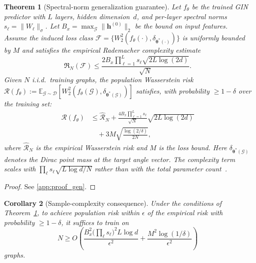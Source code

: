 \documentclass[aps,prx,reprint,superscriptaddress,longbibliography]{revtex4-2}
\newcommand{\GIN}{\textnormal{\textsc{GIN}}}
\newcommand{\calG}{\mathcal{G}}
\newcommand{\calD}{\mathcal{D}}
\newcommand{\calF}{\mathcal{F}}
\newcommand{\calR}{\mathcal{R}}
\newcommand{\bbE}{\mathbb{E}}
\newtheorem{theorem}{Theorem}
\newtheorem{corollary}[theorem]{Corollary}
\begin{document}
\begin{theorem}[Spectral-norm generalization guarantee]
\label{thm:generalization}
Let $f_\theta$ be the trained \GIN{} predictor with $L$ layers,
hidden dimension~$d$, and per-layer spectral norms
$s_\ell = \|W_\ell\|_{\sigma}$.
Let $B_x = \max_{\calG} \|\bm{h}^{(0)}\|_2$ be the bound on
input features. Assume the induced loss class
$\calF = \{W_2^2(f_\theta(\cdot),\delta_{\bm\theta^*(\cdot)})\}$ is
uniformly bounded by $M$ and satisfies the empirical Rademacher
complexity estimate
\begin{equation*}
    \mathfrak{R}_N(\calF) \le \frac{2 B_x \prod_{\ell=1}^{L} s_\ell
    \sqrt{2L\log(2d)}}{\sqrt{N}}.
\end{equation*}
Given $N$ i.i.d.\ training graphs, the
population Wasserstein risk
$\calR(f_\theta)
\!:=\!
\bbE_{\calG \sim \calD}[W_2^2(f_\theta(\calG),
\delta_{\bm\theta^*(\calG)})]$
satisfies, with probability $\ge 1 - \delta$ over the
training set:
\begin{align}
    \calR(f_\theta)
    &\le \hat{\calR}_N
    + \frac{4 B_x \prod_{\ell=1}^{L} s_\ell}{\sqrt{N}}
    \sqrt{2L\log(2d)} \nonumber \\
    &\quad + 3M\!\sqrt{\frac{\log(2/\delta)}{2N}},
    \label{eq:gen_bound}
\end{align}
where $\hat{\calR}_N$ is the empirical Wasserstein risk
and $M$ is the loss bound. Here $\delta_{\bm\theta^*(\calG)}$ denotes
the Dirac point mass at the target angle vector. The complexity term scales with
$\prod_\ell s_\ell \sqrt{L\log d / N}$ rather than with the total
parameter count~\cite{bartlett2017,neyshabur2018,golowich2018}.
\end{theorem}

\begin{proof}
See \cref{app:proof_gen}.
\end{proof}

\begin{corollary}[Sample-complexity consequence]
\label{cor:sample_complexity}
Under the conditions of Theorem~\ref{thm:generalization}, to
achieve population risk within $\epsilon$ of the empirical risk
with probability $\ge 1 - \delta$, it suffices to train on
\begin{equation}
    N \ge O\!\left(
    \frac{B_x^2 \bigl(\prod_\ell s_\ell\bigr)^2
    L \log d}{\epsilon^2}
    + \frac{M^2 \log(1/\delta)}{\epsilon^2}
    \right)
    \label{eq:sample_complexity}
\end{equation}
graphs.
\end{corollary}
\end{document}
